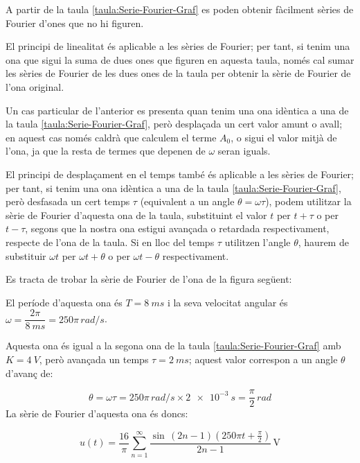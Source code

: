 A partir de la taula \vref{taula:Serie-Fourier-Graf} es poden obtenir fàcilment sèries de Fourier d'ones que no hi figuren.

El principi de linealitat és aplicable a les sèries de Fourier; per tant, si tenim una ona que sigui la suma de dues ones que figuren en aquesta taula, només  cal sumar les sèries de Fourier de les dues ones de la taula per obtenir la sèrie de Fourier de l'ona original.

Un cas particular de l'anterior es presenta quan tenim una ona  idèntica a una de la taula \ref{taula:Serie-Fourier-Graf}, però desplaçada un cert valor amunt o avall; en aquest cas només caldrà que calculem el terme $A_0$, o sigui el valor mitjà de l'ona, ja que la resta de termes que depenen de $\omega$ seran iguals.

El principi de desplaçament en el temps també és aplicable a les sèries de Fourier; per tant, si tenim una ona idèntica a una de la taula \ref{taula:Serie-Fourier-Graf}, però desfasada un cert temps $\tau$ (equivalent a un angle $\theta = \omega \tau$), podem utilitzar la sèrie de Fourier d'aquesta ona de la taula, substituint el valor $t$ per $t+\tau$ o per $t-\tau$, segons que la nostra ona estigui avançada o retardada respectivament, respecte de l'ona de la taula. Si en lloc del temps $\tau$ utilitzen l'angle $\theta$, haurem de substituir  $\omega t$ per $\omega t + \theta$ o per $\omega t - \theta$ respectivament.


\begin{exemple}[\SerieFouTaulaFormes{}]
	\addcontentsxms{\SerieFouTaulaFormes}
    Es tracta de trobar la sèrie de Fourier de l'ona de la figura següent:
    \begin{center}
        
    \end{center}

    El període d'aquesta ona és $T=\qty{8}{ms}$ i la seva velocitat angular és $\omega = \dfrac{2\pi}{\qty{8}{ms}} = 250 \pi\unit{\,rad/s}$.

    Aquesta ona és igual a la segona ona de la taula \vref{taula:Serie-Fourier-Graf} amb $K=\qty{4}{V}$, però avançada un temps $\tau=\qty{2}{ms}$; aquest valor correspon a un angle $\theta$ d'avanç de:

    \[
        \theta = \omega \tau = 250\pi\unit{\,rad/s} \times \qty{2e-3}{s} = \frac{\pi}{2}\unit{\,rad}
    \]
    La sèrie de Fourier d'aquesta ona és doncs:

    \[
    u(t) = \frac{{16}}{\pi }\sum\limits_{n = 1}^\infty  {\frac{{\sin \,(2n - 1)(250\pi t+ \frac{\pi}{2})}}{{2n - 1}}} \,\text{V}
    \]
\end{exemple}

